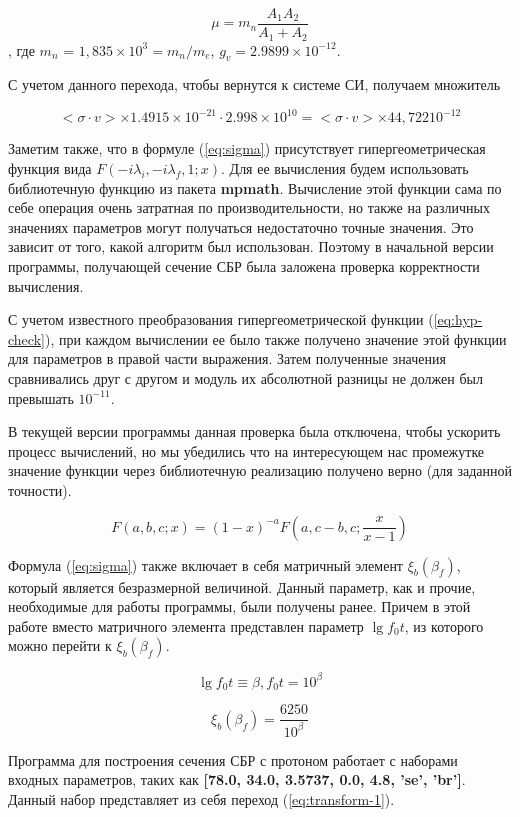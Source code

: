 \documentclass[%
master,    %
natbib,      %
subf,        %
href,        %
colorlinks,  %
]{disser}
\begin{document}
\begin{equation}
\mu = m_n \frac{A_1 A_2}{A_1 + A_2}
\end{equation}
, где $m_n$ = $1,835\times10^3 = m_n/m_e$, $g_v = 2.9899 \times 10^{-12}$.

С учетом данного перехода, чтобы вернутся к системе СИ, получаем множитель 

$$
	<\sigma \cdot v> \times 1.4915 \times 10^{-21} \cdot 2.998 \times 10^{10} = 	<\sigma \cdot v> \times 44,722 10^{-12}
$$

Заметим также, что в формуле (\ref{eq:sigma}) присутствует гипергеометрическая функция вида $F(-i\lambda_i,-i\lambda_f,1;x)$. Для ее вычисления будем использовать библиотечную функцию из пакета \textbf{mpmath}. Вычисление этой функции сама по себе операция очень затратная по производительности, но также на различных значениях параметров могут получаться недостаточно точные значения. Это зависит от того, какой алгоритм был использован. Поэтому в начальной версии программы, получающей сечение СБР была заложена проверка корректности вычисления. 

С учетом известного преобразования гипергеометрической функции (\ref{eq:hyp-check}), при каждом вычислении ее было также получено значение этой функции для параметров в правой части выражения. Затем полученные значения сравнивались друг с другом и модуль их абсолютной разницы не должен был превышать $10^{-11}$. 

В текущей версии программы данная проверка была отключена, чтобы ускорить процесс вычислений, но мы убедились что на интересующем нас промежутке значение функции через библиотечную реализацию получено верно (для заданной точности).

\begin{equation}
\label{eq:hyp-check}
F(a,b,c;x) = (1-x)^{-a}F\left(a,c-b,c; \frac{x}{x-1}\right)
\end{equation}

Формула (\ref{eq:sigma}) также включает в себя матричный элемент $\xi_b(\beta_f)$, который является безразмерной величиной. Данный параметр, как и прочие, необходимые для работы программы, были получены ранее\cite{tak}. Причем в этой работе вместо матричного элемента представлен параметр $\lg f_0 t$, из которого можно перейти к  $\xi_b(\beta_f)$.

$$
\lg f_0 t \equiv \beta, f_0 t = 10^\beta
$$

$$
\xi_b(\beta_f) = \frac{6250}{10^\beta}
$$

Программа для построения сечения СБР с протоном работает с наборами входных параметров, таких как \textbf{[78.0, 34.0, 3.5737, 0.0, 4.8, 'se', 'br']}. Данный набор представляет из себя переход (\ref{eq:transform-1}).
\end{document}
